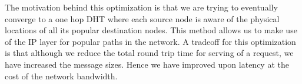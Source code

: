 The motivation behind this optimization is that we are trying to eventually converge to a one hop DHT where each source node is aware of the physical locations of all its popular destination nodes. This method allows us to make use of the IP layer for popular paths in the network. A tradeoff for this optimization is that although we reduce the total round trip time for serving of a request, we have increased the message sizes. Hence we have improved upon latency at the cost of the network bandwidth.
